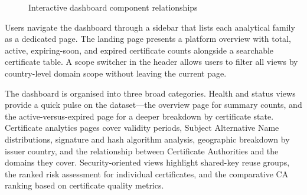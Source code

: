\begin{figure}[H]
  \centering
  \caption{Interactive dashboard component relationships}
  \label{fig:frontend-component-flow}
\end{figure}

Users navigate the dashboard through a sidebar that lists each analytical
family as a dedicated page. The landing page presents a platform overview with
total, active, expiring-soon, and expired certificate counts alongside a
searchable certificate table. A scope switcher in the header allows users to
filter all views by country-level domain scope without leaving the current
page.

The dashboard is organised into three broad categories. Health and status
views provide a quick pulse on the dataset---the overview page for summary
counts, and the active-versus-expired page for a deeper breakdown by
certificate state. Certificate analytics pages cover validity periods,
Subject Alternative Name distributions, signature and hash algorithm
analysis, geographic breakdown by issuer country, and the relationship
between Certificate Authorities and the domains they cover. Security-oriented
views highlight shared-key reuse groups, the ranked risk assessment for
individual certificates, and the comparative CA ranking based on certificate
quality metrics.

